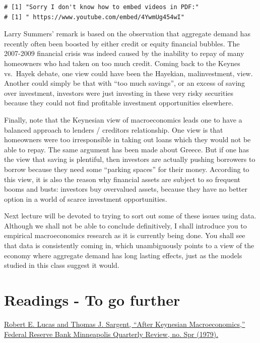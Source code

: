 \documentclass[]{book}
\begin{document}
\begin{verbatim}
# [1] "Sorry I don't know how to embed videos in PDF:"
# [1] " https://www.youtube.com/embed/4YwmUg454wI"
\end{verbatim}

Larry Summers' remark is based on the observation that aggregate demand
has recently often been boosted by either credit or equity financial
bubbles. The 2007-2009 financial crisis was indeed caused by the
inability to repay of many homeowners who had taken on too much credit.
Coming back to the Keynes vs.~Hayek debate, one view could have been the
Hayekian, malinvestment, view. Another could simply be that with ``too
much savings'', or an excess of saving over investment, investors were
just investing in these very risky securities because they could not
find profitable investment opportunities elsewhere.

Finally, note that the Keynesian view of macroeconomics leads one to
have a balanced approach to lenders / creditors relationship. One view
is that homeowners were too irresponsible in taking out loans which they
would not be able to repay. The same argument has been made about
Greece. But if one has the view that saving is plentiful, then investors
are actually pushing borrowers to borrow because they need some
``parking spaces'' for their money. According to this view, it is also
the reason why financial assets are subject to so frequent booms and
busts: investors buy overvalued assets, because they have no better
option in a world of scarce investment opportunities.

Next lecture will be devoted to trying to sort out some of these issues
using data. Although we shall not be able to conclude definitively, I
shall introduce you to empirical macroeconomics research as it is
currently being done. You shall see that data is consistently coming in,
which unambiguously points to a view of the economy where aggregate
demand has long lasting effects, just as the models studied in this
class suggest it would.

\section*{Readings - To go further}\label{readings---to-go-further-12}

\href{https://www.minneapolisfed.org/research/qr/qr321.pdf}{Robert E.
Lucas and Thomas J. Sargent, ``After Keynesian Macroeconomics,'' Federal
Reserve Bank Minneapolis Quarterly Review, no. Spr (1979).}
\end{document}
